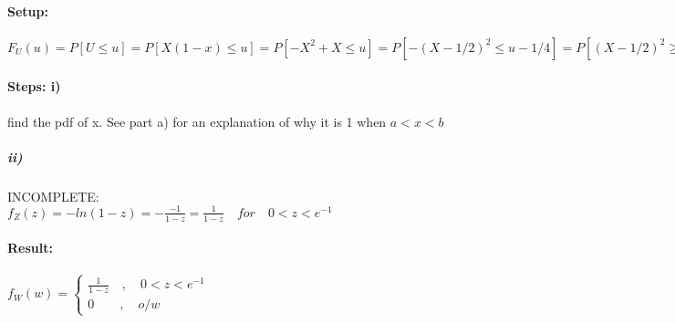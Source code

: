 \paragraph{Setup:} ${ F }_{ U }(u)=P[U\le u]=P[X(1-x)\le u]=P[-{X}^{2}+X \le u]=P[-(X-1/2)^{2}\le u-1/4]= P[(X-1/2)^{2}\ge 1/4-u]== P[\left|(X-1/2) \right| \ge (1/4-u)^{1/2} ]= $

\paragraph{Steps: i)} find the pdf of x. See part a) for an explanation of why it is 1 when $a<x<b$


\subparagraph{ii)}INCOMPLETE:\\ ${ f }_{ Z }(z)= -ln(1-z)=-\frac { -1 }{1-z}=\frac{1}{1-z} \quad for \quad 0<z<{e}^{-1}$

\paragraph{Result:} ${ f }_{ W }(w)=\begin{cases} \frac{ 1 }{1-z} \quad ,\quad 0<z<{e}^{-1} \\ 0\quad  \quad ,\quad o/w \end{cases}$